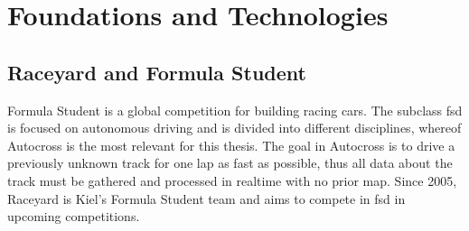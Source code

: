 

\graphicspath{{Chapter/Figs/FoundationsAndTechnologies/}}
\chapter{Foundations and Technologies}

\section{Raceyard and Formula Student}
Formula Student is a global competition for building racing cars. The subclass \ac{fsd} is focused on autonomous driving and is divided into different disciplines, whereof Autocross is the most relevant for this thesis. The goal in Autocross is to drive a previously unknown track for one lap as fast as possible, thus all data about the track must be gathered and processed in realtime with no prior map.
Since 2005, Raceyard is Kiel's Formula Student team and aims to compete in \ac{fsd} in upcoming competitions.



